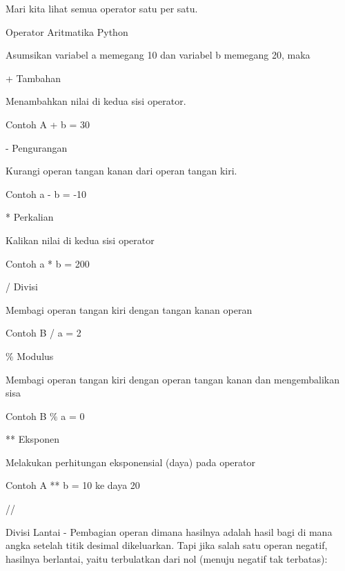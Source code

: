 Mari kita lihat semua operator satu per satu. \par
\vspace{12pt}
\noindent 
Operator Aritmatika Python \par
\vspace{12pt}
\noindent 
Asumsikan variabel a memegang 10 dan variabel b memegang 20, maka  \par
\vspace{12pt}
\noindent 
+ Tambahan \par
\noindent 
Menambahkan nilai di kedua sisi operator. \par
\noindent 
Contoh A + b = 30 \par
\vspace{12pt}
\noindent 
- Pengurangan \par
\noindent 
Kurangi operan tangan kanan dari operan tangan kiri. \par
\noindent 
Contoh a - b = -10 \par
\vspace{12pt}
\noindent 
* Perkalian \par
\noindent 
Kalikan nilai di kedua sisi operator \par
\noindent 
Contoh a * b = 200 \par
\vspace{12pt}
\noindent 
/ Divisi \par
\noindent 
Membagi operan tangan kiri dengan tangan kanan operan \par
\noindent 
Contoh B / a = 2 \par
\vspace{12pt}
\noindent 
 $  \%  $ Modulus \par
\noindent 
Membagi operan tangan kiri dengan operan tangan kanan dan mengembalikan sisa \par
\noindent 
Contoh B $  \%  $ a = 0 \par
\vspace{12pt}
\noindent 
** Eksponen \par
\noindent 
Melakukan perhitungan eksponensial (daya) pada operator \par
\noindent 
Contoh A ** b = 10 ke daya 20 \par
\vspace{12pt}
\noindent 
// \par
\vspace{12pt}
\noindent 
Divisi Lantai - Pembagian operan dimana hasilnya adalah hasil bagi di mana angka setelah titik desimal dikeluarkan. $  $Tapi jika salah satu operan negatif, hasilnya berlantai, yaitu terbulatkan dari nol (menuju negatif tak terbatas): \par
